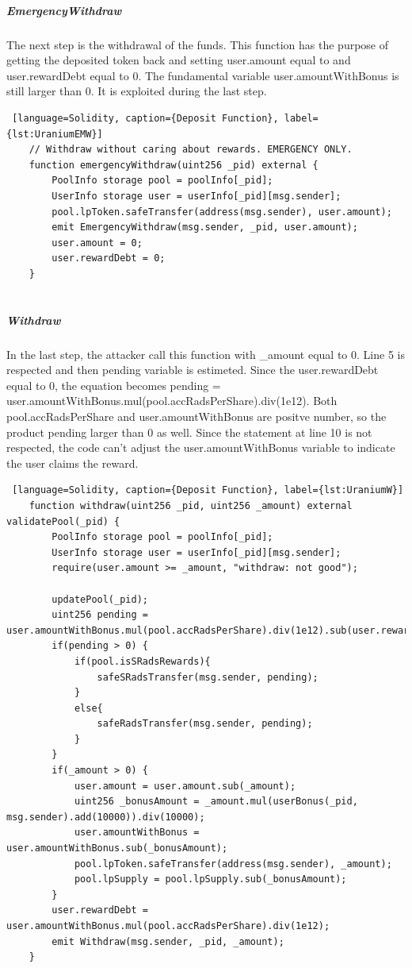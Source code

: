\subparagraph{EmergencyWithdraw} 
The next step is the withdrawal of the funds. 
This function has the purpose of getting the deposited token back and setting user.amount equal to and user.rewardDebt equal to 0.
The fundamental variable user.amountWithBonus is still larger than 0. It is exploited during the last step.

\begin{lstlisting} [language=Solidity, caption={Deposit Function}, label={lst:UraniumEMW}]
    // Withdraw without caring about rewards. EMERGENCY ONLY.
    function emergencyWithdraw(uint256 _pid) external {
        PoolInfo storage pool = poolInfo[_pid];
        UserInfo storage user = userInfo[_pid][msg.sender];
        pool.lpToken.safeTransfer(address(msg.sender), user.amount);
        emit EmergencyWithdraw(msg.sender, _pid, user.amount);
        user.amount = 0;
        user.rewardDebt = 0;
    }
    
\end{lstlisting} 

\subparagraph{Withdraw} In the last step, the attacker call this function with \_amount equal to 0.
Line 5 is respected and then pending variable is estimeted.
Since the user.rewardDebt equal to 0, the equation becomes
pending = user.amountWithBonus.mul(pool.accRadsPerShare).div(1e12).
Both pool.accRadsPerShare and user.amountWithBonus are positve number, so the product pending larger than 0 as well.
Since the statement at line 10 is not respected, the code can't adjust the user.amountWithBonus variable to indicate the user claims the reward.

\begin{lstlisting} [language=Solidity, caption={Deposit Function}, label={lst:UraniumW}]
    function withdraw(uint256 _pid, uint256 _amount) external validatePool(_pid) {
        PoolInfo storage pool = poolInfo[_pid];
        UserInfo storage user = userInfo[_pid][msg.sender];
        require(user.amount >= _amount, "withdraw: not good");

        updatePool(_pid);
        uint256 pending = user.amountWithBonus.mul(pool.accRadsPerShare).div(1e12).sub(user.rewardDebt);
        if(pending > 0) {
            if(pool.isSRadsRewards){
                safeSRadsTransfer(msg.sender, pending);
            }
            else{
                safeRadsTransfer(msg.sender, pending);
            }
        }
        if(_amount > 0) {
            user.amount = user.amount.sub(_amount);
            uint256 _bonusAmount = _amount.mul(userBonus(_pid, msg.sender).add(10000)).div(10000);
            user.amountWithBonus = user.amountWithBonus.sub(_bonusAmount);
            pool.lpToken.safeTransfer(address(msg.sender), _amount);
            pool.lpSupply = pool.lpSupply.sub(_bonusAmount);
        }
        user.rewardDebt = user.amountWithBonus.mul(pool.accRadsPerShare).div(1e12);
        emit Withdraw(msg.sender, _pid, _amount);
    }

\end{lstlisting} 

